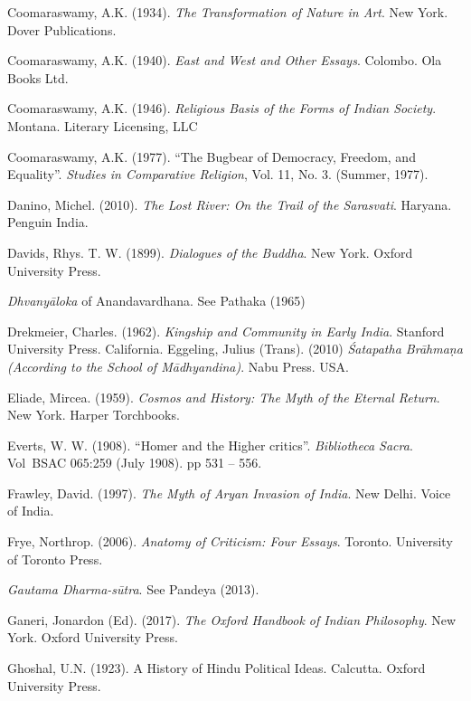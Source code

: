 \begin{thebibliography}{99}
Coomaraswamy, A.K. (1934). {\sl The Transformation of Nature in Art}. New York. Dover Publications.

Coomaraswamy, A.K. (1940). {\sl East and West and Other Essays}. Colombo. Ola Books Ltd. 

Coomaraswamy, A.K. (1946). {\sl Religious Basis of the Forms of Indian Society}. Montana. Literary Licensing, LLC

Coomaraswamy, A.K. (1977). “The Bugbear of Democracy, Freedom, and Equality”. {\sl Studies in Comparative Religion}, Vol. 11, No. 3. (Summer, 1977). 

Danino, Michel. (2010). {\sl The Lost River: On the Trail of the Sarasvati}. Haryana. Penguin India.  

Davids, Rhys. T. W. (1899). {\sl Dialogues of the Buddha}. New York. Oxford University Press. 

{\sl Dhvanyāloka} of Anandavardhana. See Pathaka  (1965)

Drekmeier, Charles. (1962). {\sl Kingship and Community in Early India}. Stanford University Press. California. Eggeling, Julius (Trans). (2010) {\sl Śatapatha Brāhmaṇa (According to the School of Mādhyandina)}. Nabu   Press. USA. 

Eliade, Mircea. (1959). {\sl Cosmos and History: The Myth of the Eternal Return}. New York. Harper Torchbooks. 

Everts, W. W. (1908). “Homer and the Higher critics”. {\sl Bibliotheca Sacra}. Vol BSAC 065:259 (July 1908). pp 531 – 556. 

Frawley, David. (1997). {\sl The Myth of Aryan Invasion of India}.  New Delhi. Voice of India. 

Frye, Northrop. (2006). {\sl Anatomy of Criticism: Four Essays}. Toronto. University of Toronto Press. 

{\sl Gautama Dharma-sūtra}. See Pandeya  (2013). 

Ganeri, Jonardon (Ed). (2017). {\sl The Oxford Handbook of Indian Philosophy}. New York. Oxford University Press. 

Ghoshal, U.N. (1923). A History of Hindu Political Ideas. Calcutta. Oxford University Press. 


\end{thebibliography}
